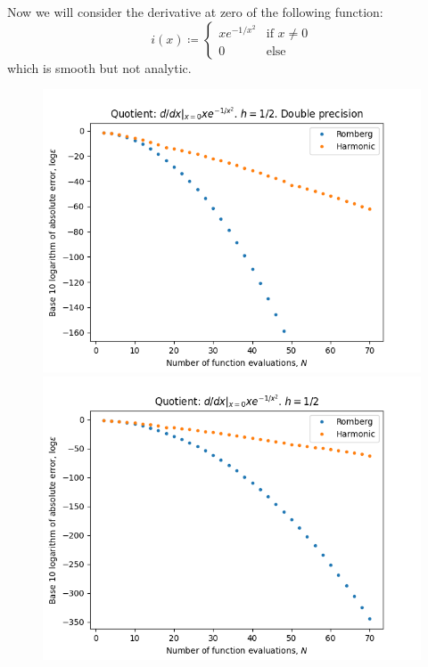 Now we will consider the derivative at zero of the following function:
\[
i(x)\coloneqq \begin{cases}
xe^{-1/x^2} & \text{if } x \neq 0\\
0 & \text{else}
\end{cases}
\]
which is smooth but not analytic.

\begin{figure}[H]
\centering
\begin{minipage}{0.45\textwidth}
\centering
\includegraphics[scale=0.45]{../results/diff_quot_plots/xemxm2.png}
\end{minipage}
\begin{minipage}{0.45\textwidth}
\centering
\includegraphics[scale=0.45]{../results/diff_quot_plots/xemxm2_hp.png}
\end{minipage}
\end{figure}

